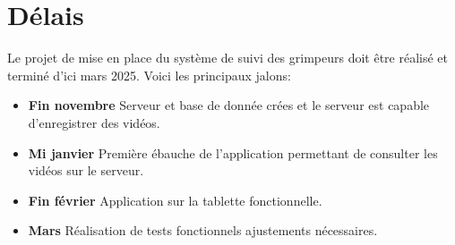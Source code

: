 \documentclass[a4paper, 11pt, french]{article}
\begin{document}
\section{Délais}
Le projet de mise en place du système de suivi des grimpeurs doit être réalisé et terminé d'ici mars 2025. Voici les principaux jalons: 
\begin{itemize}
  \item \textbf{Fin novembre} Serveur et base de donnée crées et le serveur est capable d'enregistrer des vidéos. 
  \item \textbf{Mi janvier} Première ébauche de l'application permettant de consulter les vidéos sur le serveur. 
  \item \textbf{Fin février} Application sur la tablette fonctionnelle.
  \item \textbf{Mars} Réalisation de tests fonctionnels ajustements nécessaires.
\end{itemize}












      
\end{document}
